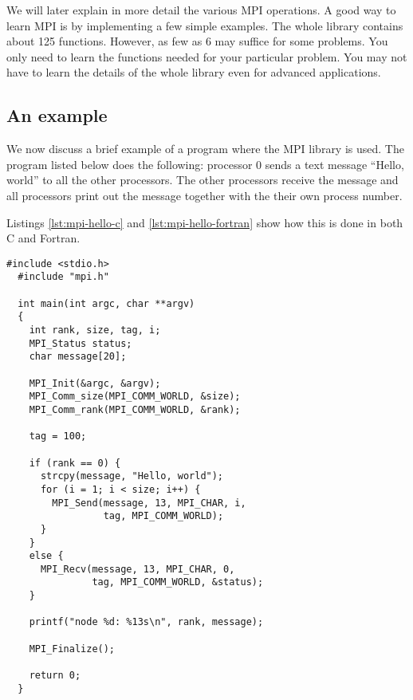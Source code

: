 We will later explain in more detail the various MPI operations. A good way to
learn MPI is by implementing a few simple examples. The whole library contains
about 125 functions. However, as few as 6 may suffice for some problems. You
only need to learn the functions needed for your particular problem. You may not
have to learn the details of the whole library even for advanced applications.

\subsection{An example}

We now discuss a brief example of a program where the MPI library is used. The
program listed below does the following: processor 0 sends a text message
``Hello, world'' to all the other processors. The other processors receive the
message and all processors print out the message together with the their own
process number.

Listings \ref{lst:mpi-hello-c} and \ref{lst:mpi-hello-fortran} show how this is
done in both C and Fortran.

\begin{lstlisting}[style=c, float, caption={Hello world MPI in C.}, label=lst:mpi-hello-c]
  #include <stdio.h>
  #include "mpi.h"

  int main(int argc, char **argv)
  {
    int rank, size, tag, i;
    MPI_Status status;
    char message[20];

    MPI_Init(&argc, &argv);
    MPI_Comm_size(MPI_COMM_WORLD, &size);
    MPI_Comm_rank(MPI_COMM_WORLD, &rank);

    tag = 100;

    if (rank == 0) {
      strcpy(message, "Hello, world");
      for (i = 1; i < size; i++) {
        MPI_Send(message, 13, MPI_CHAR, i,
                 tag, MPI_COMM_WORLD);
      }
    }
    else {
      MPI_Recv(message, 13, MPI_CHAR, 0,
               tag, MPI_COMM_WORLD, &status);
    }

    printf("node %d: %13s\n", rank, message);

    MPI_Finalize();

    return 0;
  }
\end{lstlisting}


